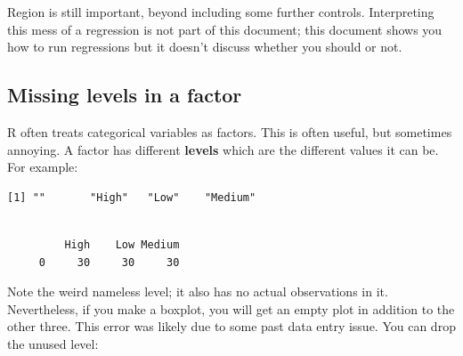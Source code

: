 \documentclass[
  letterpaper,
  DIV=11,
  numbers=noendperiod]{scrreprt}
\newenvironment{Shaded}{\begin{snugshade}}{\end{snugshade}}
\newcommand{\FunctionTok}[1]{\textcolor[rgb]{0.02,0.16,0.49}{#1}}
\newcommand{\NormalTok}[1]{\textcolor[rgb]{0.00,0.44,0.13}{#1}}
\newcommand{\OtherTok}[1]{\textcolor[rgb]{0.00,0.44,0.13}{#1}}
\newcommand{\SpecialCharTok}[1]{\textcolor[rgb]{0.25,0.44,0.63}{#1}}
\begin{document}
Region is still important, beyond including some further controls.
Interpreting this mess of a regression is not part of this document;
this document shows you how to run regressions but it doesn't discuss
whether you should or not.

\hypertarget{missing-levels-in-a-factor}{%
\subsection{Missing levels in a
factor}\label{missing-levels-in-a-factor}}

R often treats categorical variables as factors. This is often useful,
but sometimes annoying. A factor has different \textbf{levels} which are
the different values it can be. For example:

\begin{Shaded}
\end{Shaded}

\begin{verbatim}
[1] ""       "High"   "Low"    "Medium"
\end{verbatim}

\begin{Shaded}
\end{Shaded}

\begin{verbatim}

         High    Low Medium 
     0     30     30     30 
\end{verbatim}

Note the weird nameless level; it also has no actual observations in it.
Nevertheless, if you make a boxplot, you will get an empty plot in
addition to the other three. This error was likely due to some past data
entry issue. You can drop the unused level:

\begin{Shaded}
\end{Shaded}
\end{document}
